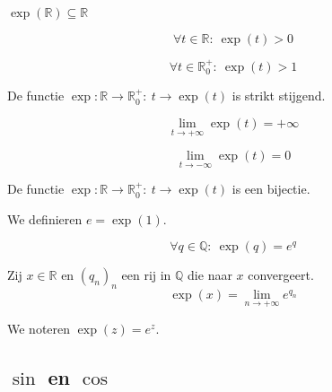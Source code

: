 \documentclass[main.tex]{subfiles}
\begin{document}
\begin{pr}
  $\exp(\mathbb{R}) \subseteq \mathbb{R}$
\end{pr}

\begin{bpr}
  \[ \forall t \in \mathbb{R}:\ \exp(t) > 0 \]
\end{bpr}

\begin{bpr}
  \[ \forall t \in \mathbb{R}_{0}^{+}:\ \exp(t) > 1 \]
\end{bpr}

\begin{bpr}
  De functie $\exp: \mathbb{R} \rightarrow \mathbb{R}_{0}^{+}:\ t \rightarrow \exp(t)$ is strikt stijgend.
\end{bpr}

\begin{bpr}
  \[ \lim_{t \rightarrow +\infty}\exp(t) = +\infty \]
\end{bpr}

\begin{bpr}
  \[ \lim_{t \rightarrow -\infty}\exp(t) = 0 \]
\end{bpr}

\begin{bpr}
  De functie $\exp: \mathbb{R} \rightarrow \mathbb{R}_{0}^{+}:\ t \rightarrow \exp(t)$ is een bijectie.
\end{bpr}


\begin{de}
  We definieren $e = \exp(1)$.
\end{de}

\begin{bpr}
  \[ \forall q \in \mathbb{Q}:\ \exp(q) = e^{q} \]
\end{bpr}

\begin{bpr}
  Zij $x\in \mathbb{R}$ en $(q_{n})_{n}$ een rij in $\mathbb{Q}$ die naar $x$ convergeert.
  \[ \exp(x) = \lim_{n\rightarrow +\infty}e^{q_{n}} \]
\end{bpr}

\begin{de}
  We noteren $\exp(z) = e^{z}$.
\end{de}

\subsection{$\sin$ en $\cos$}
\label{sec:sin-en-cos}
\end{document}

